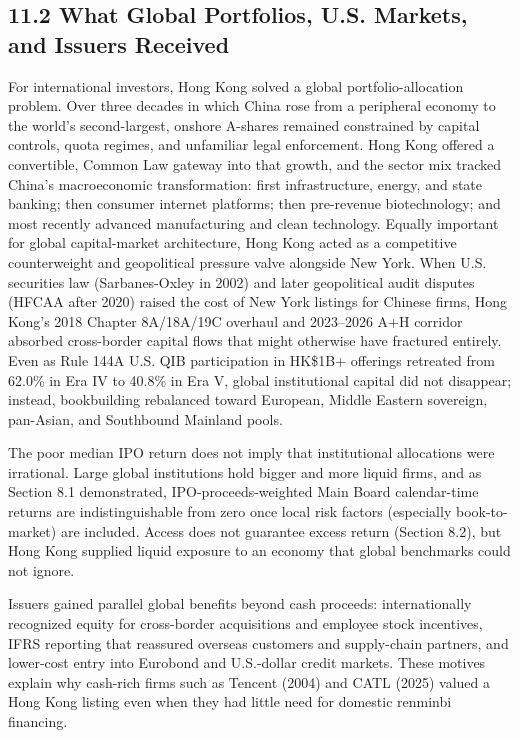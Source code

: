 \documentclass[11pt,letterpaper]{article}
\begin{document}
\subsection*{\texorpdfstring{11.2 What Global Portfolios, U.S. Markets, and Issuers Received}{11.2 What Global Portfolios, U.S. Markets, and Issuers Received}}
For international investors, Hong Kong solved a global portfolio-allocation problem. Over three decades in which China rose from a peripheral economy to the world's second-largest, onshore A-shares remained constrained by capital controls, quota regimes, and unfamiliar legal enforcement. Hong Kong offered a convertible, Common Law gateway into that growth, and the sector mix tracked China's macroeconomic transformation: first infrastructure, energy, and state banking; then consumer internet platforms; then pre-revenue biotechnology; and most recently advanced manufacturing and clean technology. Equally important for global capital-market architecture, Hong Kong acted as a competitive counterweight and geopolitical pressure valve alongside New York. When U.S. securities law (Sarbanes-Oxley in 2002) and later geopolitical audit disputes (HFCAA after 2020) raised the cost of New York listings for Chinese firms, Hong Kong's 2018 Chapter 8A/18A/19C overhaul and 2023–2026 A+H corridor absorbed cross-border capital flows that might otherwise have fractured entirely. Even as Rule 144A U.S. QIB participation in HK\$1B+ offerings retreated from 62.0\% in Era IV to 40.8\% in Era V, global institutional capital did not disappear; instead, bookbuilding rebalanced toward European, Middle Eastern sovereign, pan-Asian, and Southbound Mainland pools.

The poor median IPO return does not imply that institutional allocations were irrational. Large global institutions hold bigger and more liquid firms, and as Section 8.1 demonstrated, IPO-proceeds-weighted Main Board calendar-time returns are indistinguishable from zero once local risk factors (especially book-to-market) are included. Access does not guarantee excess return (Section 8.2), but Hong Kong supplied liquid exposure to an economy that global benchmarks could not ignore.

Issuers gained parallel global benefits beyond cash proceeds: internationally recognized equity for cross-border acquisitions and employee stock incentives, IFRS reporting that reassured overseas customers and supply-chain partners, and lower-cost entry into Eurobond and U.S.-dollar credit markets. These motives explain why cash-rich firms such as Tencent (2004) and CATL (2025) valued a Hong Kong listing even when they had little need for domestic renminbi financing.
\end{document}
